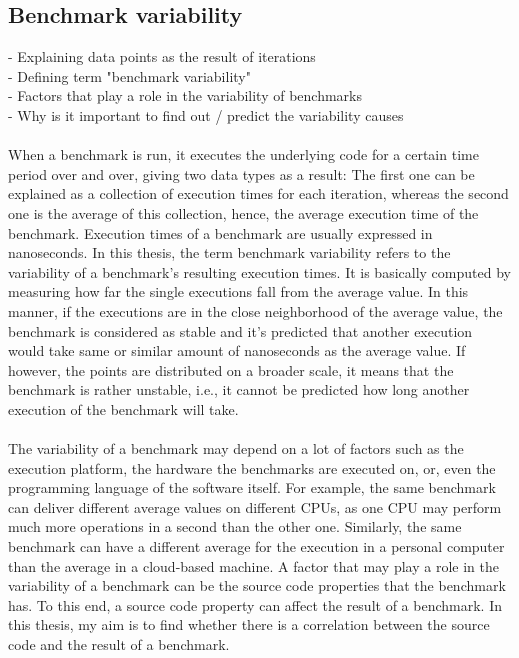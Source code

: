 \documentclass{seal_thesis}
\begin{document}
\subsection{Benchmark variability}
- Explaining data points as the result of iterations \\
- Defining term "benchmark variability" \\
- Factors that play a role in the variability of benchmarks\\
- Why is it important to find out / predict the variability causes \\
\\
When a benchmark is run, it executes the underlying code for a certain time period over and over, giving two data types as a result: The first one can be explained as a collection of execution times for each iteration, whereas the second one is the average of this collection, hence, the average execution time of the benchmark. Execution times of a benchmark are usually expressed in nanoseconds. In this thesis, the term benchmark variability refers to the variability of a benchmark's resulting execution times. It is basically computed by measuring how far the single executions fall from the average value. In this manner, if the executions are in the close neighborhood of the average value, the benchmark is considered as stable and it's predicted that another execution would take same or similar amount of nanoseconds as the average value. If however, the points are distributed on a broader scale, it means that the benchmark is rather unstable, i.e., it cannot be predicted how long another execution of the benchmark will take.\\
\\
The variability of a benchmark may depend on a lot of factors such as the execution platform, the hardware the benchmarks are executed on, or, even the programming language of the software itself. For example, the same benchmark can deliver different average values on different CPUs, as one CPU may perform much more operations in a second than the other one. Similarly, the same benchmark can have a different average for the execution in a personal computer than the average in a cloud-based machine. A factor that may play a role in the variability of a benchmark can be the source code properties that the benchmark has. To this end, a source code property can affect the result of a benchmark. In this thesis, my aim is to find whether there is a correlation between the source code and the result of a benchmark.\\
\end{document}
